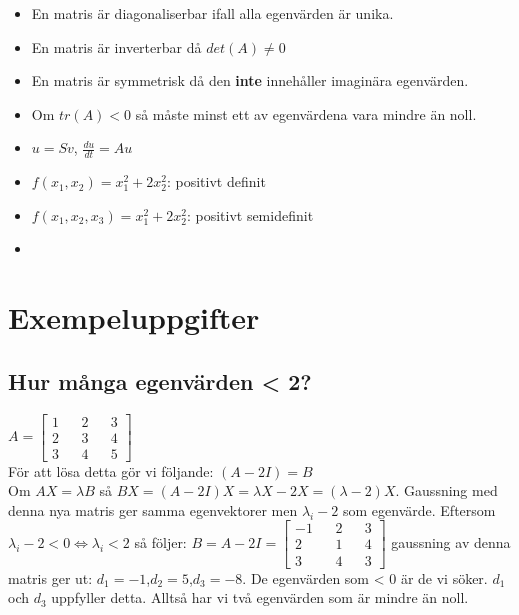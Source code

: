 \documentclass[a4paper]{article}
\begin{document}
\begin{itemize}
\item En matris är diagonaliserbar ifall alla egenvärden är unika.
\item En matris är inverterbar då $det(A)\ne0$
\item En matris är symmetrisk då den \textbf{inte} innehåller imaginära egenvärden.
\item Om $tr(A)<0$ så måste minst ett av egenvärdena vara mindre än noll.
\item $u=Sv$, $\frac{du}{dt}=Au$
\item $f(x_1,x_2)=x_1^2+2x_2^2$: positivt definit
\item $f(x_1,x_2,x_3)=x_1^2+2x_2^2$: positivt semidefinit
\item 
\end{itemize}
\section{Exempeluppgifter}
\subsection{Hur många egenvärden < 2?}
$A=\begin{bmatrix}1&&2&&3\\2&&3&&4\\3&&4&&5\end{bmatrix}$\\
För att lösa detta gör vi följande: $(A-2I)=B$\\ Om $AX=\lambda B$ så $BX=(A-2I)X=\lambda X-2X=(\lambda-2)X$. Gaussning med denna nya matris ger samma egenvektorer men $\lambda_i-2$ som egenvärde. Eftersom $\lambda_i-2<0 \Leftrightarrow \lambda_i<2$ så följer:
$B=A-2I=\begin{bmatrix}-1&&2&&3\\2&&1&&4\\3&&4&&3\end{bmatrix}$ gaussning av denna matris ger ut: $d_1=-1$,$d_2=5$,$d_3=-8$. De egenvärden som < 0 är de vi söker. $d_1$ och $d_3$ uppfyller detta. Alltså har vi två egenvärden som är mindre än noll.
\end{document}
